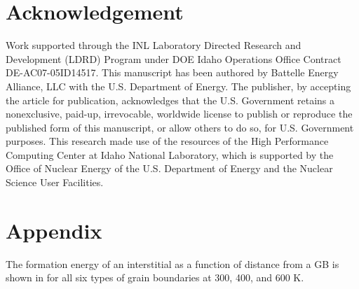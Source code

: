 \documentclass[review]{elsarticle}
\begin{document}
\section{Acknowledgement}
Work supported through the INL Laboratory Directed Research and Development (LDRD) Program under DOE Idaho Operations Office Contract DE-AC07-05ID14517. This manuscript has been authored by Battelle Energy Alliance, LLC with the U.S. Department of Energy. The publisher, by accepting the article for publication, acknowledges that the U.S. Government retains a nonexclusive, paid-up, irrevocable, worldwide license to publish or reproduce the published form of this manuscript, or allow others to do so, for U.S. Government purposes. This research made use of the resources of the High Performance Computing Center at Idaho National Laboratory, which is supported by the Office of Nuclear Energy of the U.S. Department of Energy and the Nuclear Science User Facilities.


 \newpage
 
\section{Appendix}
\setcounter{figure}{0}
\setcounter{table}{0}
\renewcommand{\thefigure}{A\arabic{figure}}
\renewcommand{\thetable}{A\arabic{table}}
\setlength{\arrayrulewidth}{.5mm}
\setlength{\tabcolsep}{12pt}
\renewcommand{\arraystretch}{1.0}

The formation energy of an interstitial as a function of distance from a GB is shown in  for all six types of grain boundaries at 300, 400, and 600 K.
\end{document}
